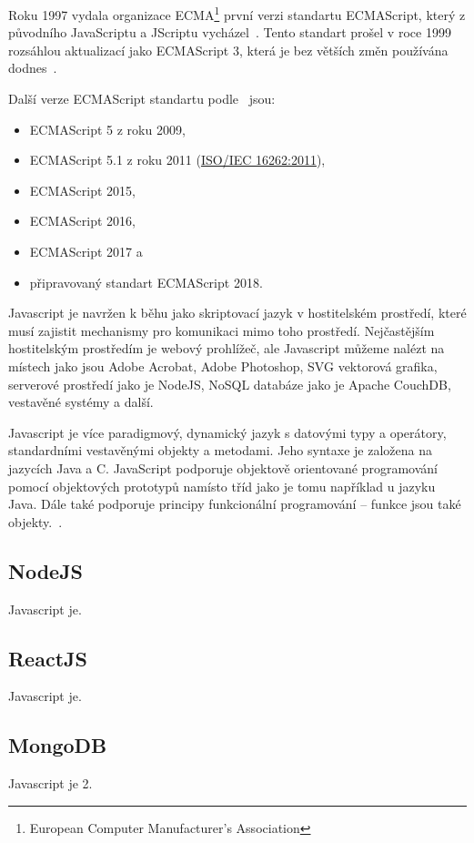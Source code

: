 Roku 1997 vydala organizace ECMA\footnote{European Computer Manufacturer's Association} první verzi standartu ECMAScript, který z původního JavaScriptu a JScriptu vycházel~\cite{ecma:ecmascript1}.
Tento standart prošel v roce 1999 rozsáhlou aktualizací jako ECMAScript 3, která je bez větších změn používána dodnes~\cite{mozzila:javascript}.

Další verze ECMAScript standartu podle~\cite{mozzila:javascriptVerisions} jsou:
\begin{itemize}
    \item ECMAScript 5 z roku 2009,
    \item ECMAScript 5.1 z roku 2011 (\href{http://www.iso.org/iso/iso_catalogue/catalogue_tc/catalogue_detail.htm?csnumber=55755}{ISO/IEC 16262:2011}),
    \item ECMAScript 2015,
    \item ECMAScript 2016,
    \item ECMAScript 2017 a
    \item připravovaný standart ECMAScript 2018.
\end{itemize}

Javascript je navržen k běhu jako skriptovací jazyk v hostitelském prostředí, které musí zajistit mechanismy pro komunikaci mimo toho prostředí.
Nejčastějším hostitelským prostředím je webový prohlížeč, ale Javascript můžeme nalézt na místech jako jsou Adobe Acrobat, Adobe Photoshop, SVG vektorová grafika, serverové prostředí jako je NodeJS, NoSQL databáze jako je Apache CouchDB, vestavěné systémy a další.~\cite{mozzila:javascript}

Javascript je více paradigmový, dynamický jazyk s datovými typy a operátory, standardními vestavěnými objekty a metodami.
Jeho syntaxe je založena na jazycích Java a C.
JavaScript podporuje objektově orientované programování pomocí objektových prototypů namísto tříd jako je tomu například u jazyku Java.
Dále také podporuje principy funkcionální programování -- funkce jsou také objekty.~\cite{mozzila:javascript}.

\subsection{NodeJS}\label{subsec:nodejs}
Javascript je.

\subsection{ReactJS}\label{subsec:reactjs}
Javascript je.

\subsection{MongoDB}\label{subsec:mongodb}
Javascript je 2.